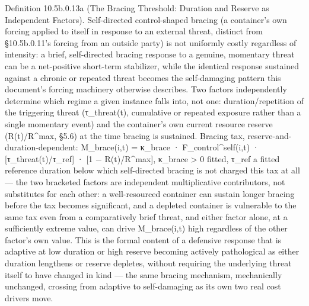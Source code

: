 \documentclass[
]{article}
\begin{document}
Definition 10.5b.0.13a (The Bracing Threshold: Duration and Reserve as
Independent Factors). Self-directed control-shaped bracing (a
container's own forcing applied to itself in response to an external
threat, distinct from §10.5b.0.11's forcing from an outside party) is
not uniformly costly regardless of intensity: a brief, self-directed
bracing response to a genuine, momentary threat can be a net-positive
short-term stabilizer, while the identical response sustained against a
chronic or repeated threat becomes the self-damaging pattern this
document's forcing machinery otherwise describes. Two factors
independently determine which regime a given instance falls into, not
one: duration/repetition of the triggering threat (τ\_threat(t),
cumulative or repeated exposure rather than a single momentary event)
and the container's own current resource reserve (R(t)/R\^{}max, §5.6)
at the time bracing is sustained. Bracing tax,
reserve-and-duration-dependent: M\_brace(i,t) = κ\_brace ·
F\_control\^{}self(i,t) · {[}τ\_threat(t)/τ\_ref{]} · {[}1 −
R(t)/R\^{}max{]}, κ\_brace \textgreater{} 0 fitted, τ\_ref a fitted
reference duration below which self-directed bracing is not charged this
tax at all --- the two bracketed factors are independent multiplicative
contributors, not substitutes for each other: a well-resourced container
can sustain longer bracing before the tax becomes significant, and a
depleted container is vulnerable to the same tax even from a
comparatively brief threat, and either factor alone, at a sufficiently
extreme value, can drive M\_brace(i,t) high regardless of the other
factor's own value. This is the formal content of a defensive response
that is adaptive at low duration or high reserve becoming actively
pathological as either duration lengthens or reserve depletes, without
requiring the underlying threat itself to have changed in kind --- the
same bracing mechanism, mechanically unchanged, crossing from adaptive
to self-damaging as its own two real cost drivers move.
\end{document}
